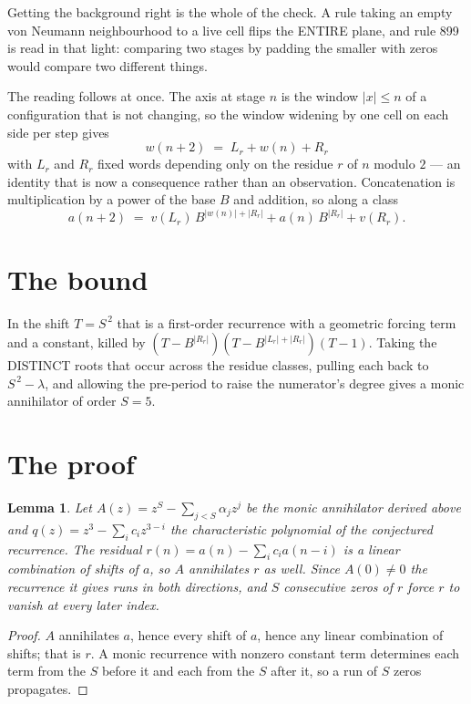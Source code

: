 \documentclass[11pt,a4paper]{article}
\theoremstyle{plain}
\newtheorem{lemma}[theorem]{Lemma}
\theoremstyle{definition}
\begin{document}
Getting the background right is the whole of the check. A rule taking an empty von Neumann
neighbourhood to a live cell flips the ENTIRE plane, and rule 899 is read
in that light: comparing two stages by padding the smaller with zeros would compare two
different things.

The reading follows at once. The axis at stage $n$ is the window $|x|\le n$ of a configuration
that is not changing, so the window widening by one cell on each side per step gives
\[
w(n+2)\;=\;L_r + w(n) + R_r
\]
with $L_r$ and $R_r$ fixed words depending only on the residue $r$ of $n$ modulo $2$ --- an
identity that is now a consequence rather than an observation. Concatenation is multiplication
by a power of the base $B$ and addition, so along a class
\[
a(n+2)\;=\;v(L_r)\,B^{|w(n)|+|R_r|} + a(n)\,B^{|R_r|} + v(R_r).
\]

\section{The bound}

In the shift $T=S^{\,2}$ that is a first-order recurrence with a geometric forcing term and a
constant, killed by $(T-B^{|R_r|})(T-B^{|L_r|+|R_r|})(T-1)$. Taking the DISTINCT roots that
occur across the residue classes, pulling each back to $S^{\,2}-\lambda$, and allowing the
pre-period to raise the numerator's degree gives a monic annihilator of order $S=5$.

\section{The proof}

\begin{lemma}\label{lem:crit}
Let $A(z)=z^S-\sum_{j<S}\alpha_jz^{j}$ be the monic annihilator derived above and
$q(z)=z^{3}-\sum_ic_iz^{3-i}$ the characteristic polynomial of the conjectured
recurrence. The residual $r(n)=a(n)-\sum_ic_ia(n-i)$ is a linear combination of shifts of $a$,
so $A$ annihilates $r$ as well. Since $A(0)\ne0$ the recurrence it gives runs in both
directions, and $S$ consecutive zeros of $r$ force $r$ to vanish at every later index.
\end{lemma}

\begin{proof}
$A$ annihilates $a$, hence every shift of $a$, hence any linear combination of shifts; that is
$r$. A monic recurrence with nonzero constant term determines each term from the $S$ before it
and each from the $S$ after it, so a run of $S$ zeros propagates.
\end{proof}
\end{document}

